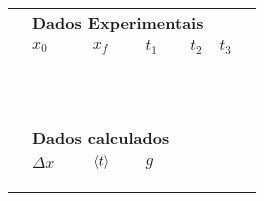 \begin{table*}[!ht]
\centering
\begin{tabular}{lp{25mm}p{25mm}p{25mm}p{25mm}p{25mm}l}
\toprule
	&\multicolumn{4}{l}{\textbf{Dados Experimentais}} \\
	\cmidrule{2-6}
	& $x_0$ & $x_f$ & $t_1$ & $t_2$ & $t_3$ & \\
	\cmidrule{2-6}
	& \cellcolor[gray]{0.89} & \cellcolor[gray]{0.92} & \cellcolor[gray]{0.89} & \cellcolor[gray]{0.92} & \cellcolor[gray]{0.89} \\
	& \cellcolor[gray]{0.95} & \cellcolor[gray]{0.97} & \cellcolor[gray]{0.95} & \cellcolor[gray]{0.97} & \cellcolor[gray]{0.95} \\
	& \cellcolor[gray]{0.89} & \cellcolor[gray]{0.92} & \cellcolor[gray]{0.89} & \cellcolor[gray]{0.92} & \cellcolor[gray]{0.89} \\
	& \cellcolor[gray]{0.95} & \cellcolor[gray]{0.97} & \cellcolor[gray]{0.95} & \cellcolor[gray]{0.97} & \cellcolor[gray]{0.95} \\
	& \cellcolor[gray]{0.89} & \cellcolor[gray]{0.92} & \cellcolor[gray]{0.89} & \cellcolor[gray]{0.92} & \cellcolor[gray]{0.89} \\
	& \cellcolor[gray]{0.95} & \cellcolor[gray]{0.97} & \cellcolor[gray]{0.95} & \cellcolor[gray]{0.97} & \cellcolor[gray]{0.95} \\
	& \cellcolor[gray]{0.89} & \cellcolor[gray]{0.92} & \cellcolor[gray]{0.89} & \cellcolor[gray]{0.92} & \cellcolor[gray]{0.89} \\
	& \cellcolor[gray]{0.95} & \cellcolor[gray]{0.97} & \cellcolor[gray]{0.95} & \cellcolor[gray]{0.97} & \cellcolor[gray]{0.95} \\
	& \cellcolor[gray]{0.89} & \cellcolor[gray]{0.92} & \cellcolor[gray]{0.89} & \cellcolor[gray]{0.92} & \cellcolor[gray]{0.89} \\
	& \cellcolor[gray]{0.95} & \cellcolor[gray]{0.97} & \cellcolor[gray]{0.95} & \cellcolor[gray]{0.97} & \cellcolor[gray]{0.95} \\
	\cmidrule{2-6}
\\
	& \multicolumn{3}{l}{\textbf{Dados calculados}} \\
	\cmidrule{2-4}
	& $\Delta x$ & $\left\langle{t}\right\rangle$ & $g$ \\
	\cmidrule{2-4}
	& \cellcolor[gray]{0.89} & \cellcolor[gray]{0.92} & \cellcolor[gray]{0.89} \\ 
	& \cellcolor[gray]{0.95} & \cellcolor[gray]{0.97} & \cellcolor[gray]{0.95} \\ 
	& \cellcolor[gray]{0.89} & \cellcolor[gray]{0.92} & \cellcolor[gray]{0.89} \\ 

\end{tabular}
\end{table*}
